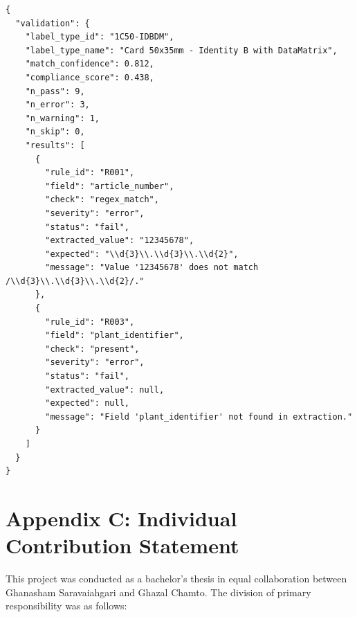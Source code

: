 \begin{lstlisting}[language={},
  caption={Truncated /api/merge-validate response for a non-compliant label.},
  label={lst:api_response}]
{
  "validation": {
    "label_type_id": "1C50-IDBDM",
    "label_type_name": "Card 50x35mm - Identity B with DataMatrix",
    "match_confidence": 0.812,
    "compliance_score": 0.438,
    "n_pass": 9,
    "n_error": 3,
    "n_warning": 1,
    "n_skip": 0,
    "results": [
      {
        "rule_id": "R001",
        "field": "article_number",
        "check": "regex_match",
        "severity": "error",
        "status": "fail",
        "extracted_value": "12345678",
        "expected": "\\d{3}\\.\\d{3}\\.\\d{2}",
        "message": "Value '12345678' does not match /\\d{3}\\.\\d{3}\\.\\d{2}/."
      },
      {
        "rule_id": "R003",
        "field": "plant_identifier",
        "check": "present",
        "severity": "error",
        "status": "fail",
        "extracted_value": null,
        "expected": null,
        "message": "Field 'plant_identifier' not found in extraction."
      }
    ]
  }
}
\end{lstlisting}

\chapter{Appendix C: Individual Contribution Statement}

This project was conducted as a bachelor's thesis in equal collaboration between
Ghanasham Saravaiahgari and Ghazal Chamto. The division of primary responsibility
was as follows:

